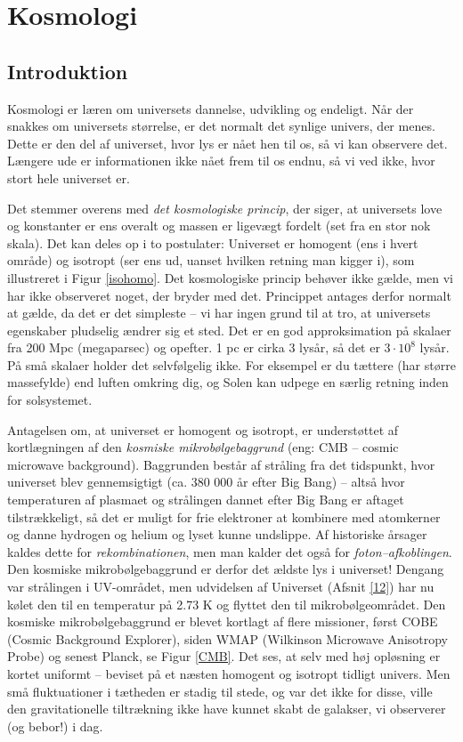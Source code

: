 \chapter{Kosmologi}
\section{Introduktion}
Kosmologi er læren om universets dannelse, udvikling og endeligt. Når der snakkes om universets størrelse, er det normalt det synlige univers, der menes. Dette er den del af universet, hvor lys er nået hen til os, så vi kan observere det. Længere ude er informationen ikke nået frem til os endnu, så vi ved ikke, hvor stort hele universet er. 

Det stemmer overens med \emph{det kosmologiske princip}, der siger, at universets love og konstanter er ens overalt og massen er ligevægt fordelt (set fra en stor nok skala). Det kan deles op i to postulater: Universet er homogent (ens i hvert område) og isotropt (ser ens ud, uanset hvilken retning man kigger i), som illustreret i Figur \ref{isohomo}. Det kosmologiske princip behøver ikke gælde, men vi har ikke observeret noget, der bryder med det. Princippet antages derfor normalt at gælde, da det er det simpleste -- vi har ingen grund til at tro, at universets egenskaber pludselig ændrer sig et sted. Det er en god approksimation på skalaer fra 200 Mpc (megaparsec) og opefter. 1 pc er cirka 3 lysår, så det er $3\cdot 10^8$ lysår. På små skalaer holder det selvfølgelig ikke. For eksempel er du tættere (har større massefylde) end luften omkring dig, og Solen kan udpege en særlig retning inden for solsystemet.

Antagelsen om, at universet er homogent og isotropt, er understøttet af
kortlægningen af den \emph{kosmiske mikrobølgebaggrund} (eng: CMB – cosmic microwave
background). Baggrunden består af stråling fra det tidspunkt, hvor universet blev
gennemsigtigt (ca. 380 000 år efter Big Bang) – altså hvor temperaturen af plasmaet
og strålingen dannet efter Big Bang er aftaget tilstrækkeligt, så det er muligt for frie elektroner at 
kombinere med atomkerner og danne hydrogen og helium
og lyset kunne undslippe. Af historiske årsager kaldes dette for \emph{rekombinationen}, men man kalder det også for \emph{foton--afkoblingen}. Den kosmiske mikrobølgebaggrund er derfor det ældste
lys i universet! Dengang var strålingen i UV-området, men udvidelsen af Universet
(Afsnit \ref{12}) har nu kølet den til en temperatur på 2.73 K og flyttet den til mikrobølgeområdet. Den kosmiske mikrobølgebaggrund er blevet kortlagt af flere
missioner, først COBE (Cosmic Background Explorer), siden WMAP (Wilkinson
Microwave Anisotropy Probe) og senest Planck, se Figur \ref{CMB}. Det ses, at selv med høj opløsning er kortet uniformt – beviset på et næsten
homogent og isotropt tidligt univers. Men små fluktuationer i tætheden er stadig til
stede, og var det ikke for disse, ville den gravitationelle tiltrækning ikke have kunnet
skabt de galakser, vi observerer (og bebor!) i dag.

